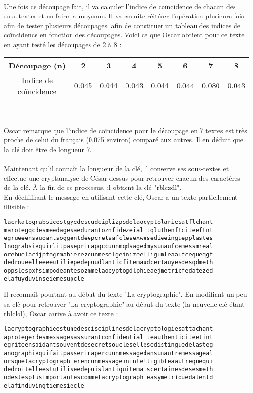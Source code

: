 		\\
		Une fois ce découpage fait, il va calculer l'indice de coïncidence de chacun des sous-textes et en faire la moyenne. Il va ensuite réitérer l'opération plusieurs fois afin de tester plusieurs découpages, afin de constituer un tableau des indices de coïncidence en fonction des découpages. Voici ce que Oscar obtient pour ce texte en ayant testé les découpages de 2 à 8 :\\
		\begin{tabular}{ | c | c | c | c | c | c | c | c | }
			\hline
Découpage (n) & 2 & 3 & 4 & 5 & 6 & 7 & 8 \\ \hline
Indice de coïncidence & 0.045 & 0.044 & 0.043 & 0.044 & 0.044 & 0.080 & 0.043 \\
			\hline
		\end{tabular} \\
		\\
		Oscar remarque que l'indice de coïncidence pour le découpage en 7 textes est très proche de celui du français (0.075 environ) comparé aux autres. Il en déduit que la clé doit être de longueur 7.\\
		\\
		Maintenant qu'il connaît la longueur de la clé, il conserve ses sous-textes et effectue une cryptanalyse de César dessus pour retrouver chacun des caractères de la clé. À la fin de ce processus, il obtient la clé "rblczdl".\\
		En déchiffrant le message en utilisant cette clé, Oscar a un texte partiellement illisible :
		\begin{lstlisting}
lacrkatograbsieestgyedesdudciplizpsdelaocyptolariesatflchant
marotegqcdesmeedagesaedurantoznfidezeialitqluthenftciteeftnt
egrueeensauoantsoggentdeepcretsafclesexwesedieeinguepplastes
lnograbsiequirlitpaseprinapqccuunmqdsagedmysunaufcemessmreal
orebuelacdjptogrmahierezounmeselgeinizeelligumleaaufcequeqgt
dedroueelleeeeutiliepedepuudlanticfitemaudcertauyesdesqdmeth
oppslespxfsimpodeantesozmmelaocyptogdlphieaejmetricfedatezed
elafuyduvinseiemesupcle
		\end{lstlisting}
		Il reconnaît pourtant au début du texte "La cryptographie". En modifiant un peu sa clé pour retrouver "La cryptographie" au début du texte (la nouvelle clé étant rblclol), Oscar arrive à avoir ce texte :
		\begin{lstlisting}
lacryptographieestunedesdisciplinesdelacryptologiesattachant
aprotegerdesmessagesassurantconfidentialiteauthenticiteetint
egriteensaidantsouventdesecretsouclesellesedistinguedelasteg
anographiequifaitpasserinapercuunmessagedansunautremessageal
orsquelacryptographierendunmessageinintelligibleaautrequequi
dedroitelleestutiliseedepuislantiquitemaiscertainesdesesmeth
odeslesplusimportantescommelacryptographieasymetriquedatentd
elafinduvingtiemesiecle
		\end{lstlisting}
